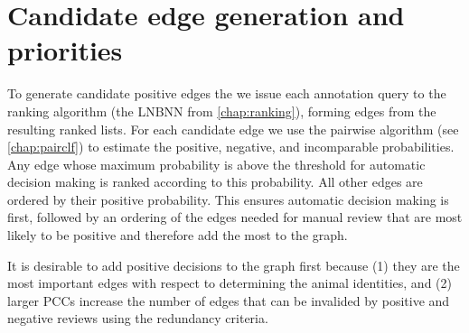 


\section{Candidate edge generation and priorities}\label{sec:cand}

To generate candidate positive edges the we issue each annotation query to the ranking algorithm (the LNBNN from
\cref{chap:ranking}), forming edges from the resulting ranked lists. For each candidate edge we use the pairwise
algorithm (see \cref{chap:pairclf}) to estimate the positive, negative, and incomparable probabilities. Any edge
whose maximum probability is above the threshold for automatic decision making is ranked according to this
probability. All other edges are ordered by their positive probability. This ensures automatic decision making is
first, followed by an ordering of the edges needed for manual review that are most likely to be positive and
therefore add the most to the graph.

It is desirable to add positive decisions to the graph first because (1) they are the most important edges with
respect to determining the animal identities, and (2) larger PCCs increase the number of edges that can be
invalided by positive and negative reviews using the redundancy criteria.

